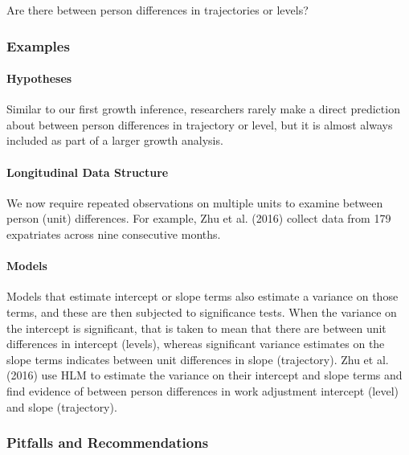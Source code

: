 \documentclass[english,,man]{apa6}
\let\oldparagraph\paragraph
\renewcommand{\paragraph}[1]{\oldparagraph{#1}\mbox{}}
\theoremstyle{definition}
\theoremstyle{definition}
\theoremstyle{definition}
\theoremstyle{remark}
\begin{document}
Are there between person differences in trajectories or levels?

\hypertarget{examples-2}{%
\subsubsection{Examples}\label{examples-2}}

\hypertarget{hypotheses-3}{%
\paragraph{Hypotheses}\label{hypotheses-3}}

Similar to our first growth inference, researchers rarely make a direct
prediction about between person differences in trajectory or level, but
it is almost always included as part of a larger growth analysis.

\hypertarget{longitudinal-data-structure-3}{%
\paragraph{Longitudinal Data
Structure}\label{longitudinal-data-structure-3}}

We now require repeated observations on multiple units to examine
between person (unit) differences. For example, Zhu et al. (2016)
collect data from 179 expatriates across nine consecutive months.

\hypertarget{models-3}{%
\paragraph{Models}\label{models-3}}

Models that estimate intercept or slope terms also estimate a variance
on those terms, and these are then subjected to significance tests. When
the variance on the intercept is significant, that is taken to mean that
there are between unit differences in intercept (levels), whereas
significant variance estimates on the slope terms indicates between unit
differences in slope (trajectory). Zhu et al. (2016) use HLM to estimate
the variance on their intercept and slope terms and find evidence of
between person differences in work adjustment intercept (level) and
slope (trajectory).

\hypertarget{pitfalls-and-recommendations-3}{%
\subsubsection{Pitfalls and
Recommendations}\label{pitfalls-and-recommendations-3}}
\end{document}
